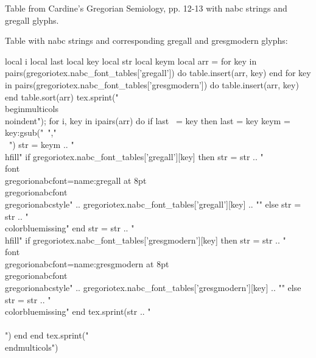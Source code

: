\documentclass[a4paper]{article}
\begin{document}
\begin{center}
Table from Cardine's Gregorian Semiology, pp. 12-13 with nabc strings and gregall glyphs.
\end{center}

\vfill
\pagebreak

\begin{center}
Table with nabc strings and corresponding gregall and gresgmodern glyphs:
\end{center}

\begin{luacode*}
  local i
  local last
  local key
  local str
  local keym
  local arr = {}
  for key in pairs(gregoriotex.nabc_font_tables['gregall']) do
    table.insert(arr, key)
  end
  for key in pairs(gregoriotex.nabc_font_tables['gresgmodern']) do
    table.insert(arr, key)
  end
  table.sort(arr)
  tex.sprint("\\begin{multicols}{3}\\noindent");
  for i, key in ipairs(arr) do
    if last ~= key then
      last = key
      keym = key:gsub("~","\\~{}")
      str = keym .. "\\hfill"
      if gregoriotex.nabc_font_tables['gregall'][key] then
        str = str .. "{\\font\\gregorionabcfont={name:gregall} at 8pt\\gregorionabcfont\\gregorionabcstyle" .. gregoriotex.nabc_font_tables['gregall'][key] .. "}"
      else
        str = str .. "{\\color{blue}missing}"
      end
      str = str .. "\\hfill"
      if gregoriotex.nabc_font_tables['gresgmodern'][key] then
        str = str .. "{\\font\\gregorionabcfont={name:gresgmodern} at 8pt\\gregorionabcfont\\gregorionabcstyle" .. gregoriotex.nabc_font_tables['gresgmodern'][key] .. "}"
      else
        str = str .. "{\\color{blue}missing}"
      end
      tex.sprint(str .. "\\\\")
    end
  end
  tex.sprint("\\end{multicols}")
\end{luacode*}

\vfill
\pagebreak
\end{document}
